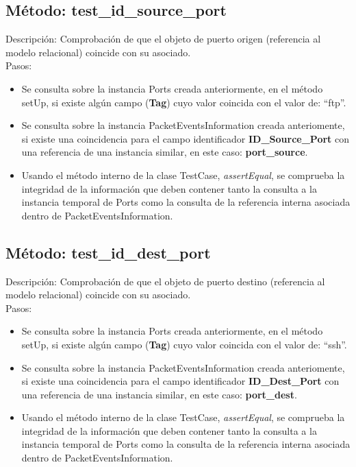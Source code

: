 

\subsection{Método: test\_id\_source\_port}

Descripción: Comprobación de que el objeto de puerto origen (referencia al modelo relacional) coincide con su asociado.\\
Pasos:
\begin{itemize}
\item Se consulta sobre la instancia Ports creada anteriormente, en el método setUp, si existe algún campo (\textbf{Tag}) cuyo valor coincida con el valor de: ``ftp''.
\item Se consulta sobre la instancia PacketEventsInformation creada anteriomente, si existe una coincidencia para el campo identificador \textbf{ID\_Source\_Port} con una referencia de una instancia similar, en este caso: \textbf{port\_source}.
\item Usando el método interno de la clase TestCase, \emph{assertEqual}, se comprueba la integridad de la información que deben contener tanto la consulta a la instancia temporal de Ports como la consulta de la referencia interna asociada dentro de PacketEventsInformation.
\end{itemize}



\subsection{Método: test\_id\_dest\_port}

Descripción: Comprobación de que el objeto de puerto destino (referencia al modelo relacional) coincide con su asociado.\\
Pasos:
\begin{itemize}
\item Se consulta sobre la instancia Ports creada anteriormente, en el método setUp, si existe algún campo (\textbf{Tag}) cuyo valor coincida con el valor de: ``ssh''.
\item Se consulta sobre la instancia PacketEventsInformation creada anteriomente, si existe una coincidencia para el campo identificador \textbf{ID\_Dest\_Port} con una referencia de una instancia similar, en este caso: \textbf{port\_dest}.
\item Usando el método interno de la clase TestCase, \emph{assertEqual}, se comprueba la integridad de la información que deben contener tanto la consulta a la instancia temporal de Ports como la consulta de la referencia interna asociada dentro de PacketEventsInformation.
\end{itemize}

